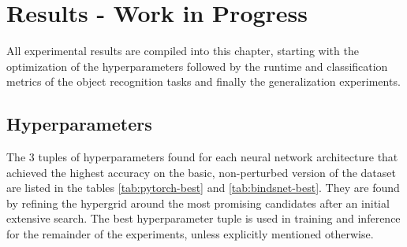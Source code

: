 \chapter{Results - Work in Progress}\label{chapter:results}
All experimental results are compiled into this chapter, starting with the optimization of the hyperparameters followed by the runtime and classification metrics of the object recognition tasks and finally the generalization experiments.
\section{Hyperparameters}
The 3 tuples of hyperparameters found for each neural network architecture that achieved the highest accuracy on the basic, non-perturbed version of the dataset are listed in the tables \ref{tab:pytorch-best} and \ref{tab:bindsnet-best}. They are found by refining the hypergrid around the most promising candidates after an initial extensive search. The best hyperparameter tuple is used in training and inference for the remainder of the experiments, unless explicitly mentioned otherwise.
